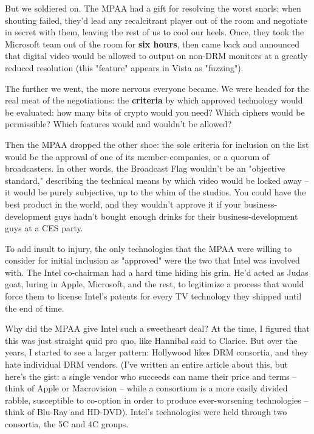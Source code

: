 But we soldiered on. The MPAA had a gift for resolving the worst
snarls: when shouting failed, they'd lead any recalcitrant player
out of the room and negotiate in secret with them, leaving the rest
of us to cool our heels. Once, they took the Microsoft team out of
the room for \textbf{six hours}, then came back and announced that
digital video would be allowed to output on non-DRM monitors at a
greatly reduced resolution (this "feature" appears in Vista as
"fuzzing").

The further we went, the more nervous everyone became. We were
headed for the real meat of the negotiations: the \textbf{criteria}
by which approved technology would be evaluated: how many bits of
crypto would you need? Which ciphers would be permissible? Which
features would and wouldn't be allowed?

Then the MPAA dropped the other shoe: the sole criteria for
inclusion on the list would be the approval of one of its
member-companies, or a quorum of broadcasters. In other words, the
Broadcast Flag wouldn't be an "objective standard," describing the
technical means by which video would be locked away -- it would be
purely subjective, up to the whim of the studios. You could have
the best product in the world, and they wouldn't approve it if your
business-development guys hadn't bought enough drinks for their
business-development guys at a CES party.

To add insult to injury, the only technologies that the MPAA were
willing to consider for initial inclusion as "approved" were the
two that Intel was involved with. The Intel co-chairman had a hard
time hiding his grin. He'd acted as Judas goat, luring in Apple,
Microsoft, and the rest, to legitimize a process that would force
them to license Intel's patents for every TV technology they
shipped until the end of time.

Why did the MPAA give Intel such a sweetheart deal? At the time, I
figured that this was just straight quid pro quo, like Hannibal
said to Clarice. But over the years, I started to see a larger
pattern: Hollywood likes DRM consortia, and they hate individual
DRM vendors. (I've written an entire article about this, but here's
the gist: a single vendor who succeeds can name their price and
terms -- think of Apple or Macrovision -- while a consortium is a
more easily divided rabble, susceptible to co-option in order to
produce ever-worsening technologies -- think of Blu-Ray and
HD-DVD). Intel's technologies were held through two consortia, the
5C and 4C groups.

